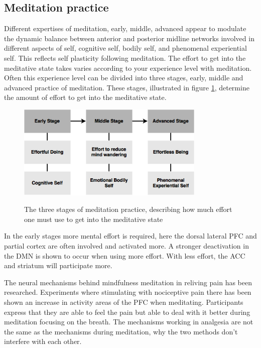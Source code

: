 \subsection{Meditation practice}
Different expertises of meditation, early, middle, advanced appear to modulate the dynamic balance between anterior and posterior midline networks involved in different aspects of self, cognitive self, bodily self, and phenomenal experiential self. This reflects self plasticity following meditation. 
The effort to get into the meditative state takes varies according to your experience level with meditation. Often this experience level can be divided into three stages, early, middle and advanced practice of meditation. These stages, illustrated in figure \ref{fig:meditation_stages}, determine the amount of effort to get into the meditative state\cite{Tang2017}. 

\begin{figure}[H]
	\includegraphics[width=0.8\textwidth]{figures/stages_of_meditation.png} 
	\caption{The three stages of meditation practice, describing how much effort one must use to get into the meditative state}
	\label{fig:meditation_stages}  
	\cite{Tang2017}
\end{figure}  

In the early stages more mental effort is required, here the dorsal lateral PFC and partial cortex are often involved and activated more. A stronger deactivation in the DMN is shown to occur when using more effort. With less effort, the ACC and striatum will participate more. \cite{Tang2017}

The neural mechanisms behind mindfulness meditation in reliving pain has been researched. Experiments where stimulating with nociceptive pain there has been shown an increase in activity areas of the PFC when meditating. Participants express that they are able to feel the pain but able to deal with it better during meditation focusing on the breath. 
The mechanisms working in analgesia are not the same as the mechanisms during meditation, why the two methods don't interfere with each other. \cite{Jacob2016}


